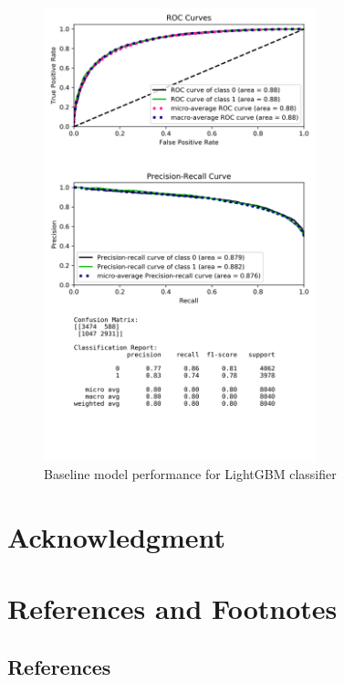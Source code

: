 \documentclass[journal,twoside,web]{ieeecolor}
\begin{document}
\begin{figure}[h!]
  \centering
  \includegraphics[width=3.1in]{project/code/preliminary-lightGBM-downsampled.png}
  \caption{Baseline model performance for LightGBM classifier}
  \label{fig:prelim-lgbm}
\end{figure}


\section*{Acknowledgment}

\section*{References and Footnotes}
\subsection{References}

\nocite{*}


\end{document}

